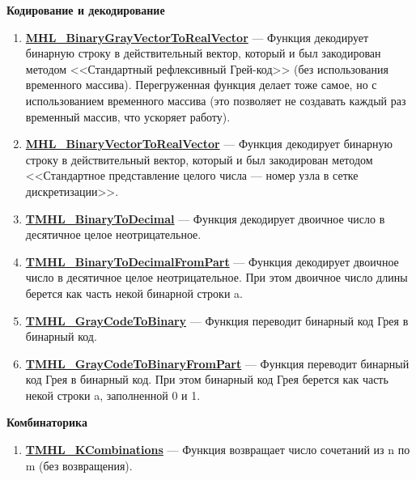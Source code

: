 \documentclass[a4paper,12pt]{article}
\begin{document}
\textbf{Кодирование и декодирование}
\begin{enumerate}

\item \textbf{\hyperref[MHL_BinaryGrayVectorToRealVector]{MHL\_BinaryGrayVectorToRealVector}} --- Функция декодирует бинарную строку в действительный вектор, который и был закодирован методом <<Стандартный рефлексивный Грей-код>> (без использования временного массива). Перегруженная функция делает тоже самое, но с использованием временного массива (это позволяет не создавать каждый раз временный массив, что ускоряет работу).

\item \textbf{\hyperref[MHL_BinaryVectorToRealVector]{MHL\_BinaryVectorToRealVector}} --- Функция декодирует бинарную строку в действительный вектор, который и был закодирован методом <<Стандартное представление целого числа --- номер узла в сетке дискретизации>>.

\item \textbf{\hyperref[TMHL_BinaryToDecimal]{TMHL\_BinaryToDecimal}} --- Функция декодирует двоичное число в десятичное целое неотрицательное.

\item \textbf{\hyperref[TMHL_BinaryToDecimalFromPart]{TMHL\_BinaryToDecimalFromPart}} --- Функция декодирует двоичное число в десятичное целое неотрицательное. При этом двоичное число длины  берется как часть некой бинарной строки a.

\item \textbf{\hyperref[TMHL_GrayCodeToBinary]{TMHL\_GrayCodeToBinary}} --- Функция переводит бинарный код Грея в бинарный код.

\item \textbf{\hyperref[TMHL_GrayCodeToBinaryFromPart]{TMHL\_GrayCodeToBinaryFromPart}} --- Функция переводит бинарный код Грея в бинарный код. При этом бинарный код Грея берется как часть некой строки a, заполненной 0 и 1.

\end{enumerate}

\textbf{Комбинаторика}
\begin{enumerate}

\item \textbf{\hyperref[TMHL_KCombinations]{TMHL\_KCombinations}} --- Функция возвращает число сочетаний из n по m (без возвращения).

\end{enumerate}
\end{document}
